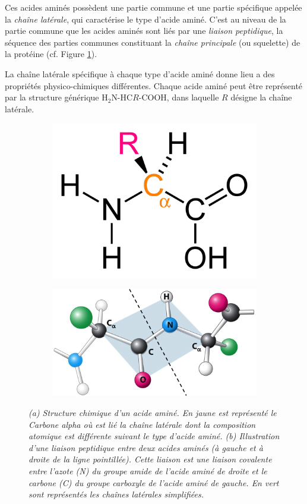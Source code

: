 Ces acides aminés possèdent une partie commune et une partie spécifique appelée la \textit{chaîne latérale}, qui caractérise le type d'acide aminé. C'est au niveau de la partie commune que les acides aminés sont liés par une \textit{liaison peptidique}, la séquence des parties communes constituant la \textit{chaîne principale} (ou squelette) de la protéine (cf. Figure \ref{Fig:amino_acid_structure}). 

La chaîne latérale spécifique à chaque type d'acide aminé donne lieu a des propriétés physico-chimiques différentes. Chaque acide aminé peut être représenté par la structure générique H$_{2}$N-HC$R$-COOH, dans laquelle $R$ désigne la chaîne latérale.

\begin{figure}
  \begin{subfigure}{.4\textwidth}
  \centering
  {\includegraphics[width=0.8\linewidth]{./figures/ch1/amino_acid_structure}}
    \caption{}
    \label{Fig:amino_acid_structure}
  \end{subfigure}
  \begin{subfigure}{.6\textwidth}
  \centering
  {\includegraphics[width=0.8\linewidth]{./figures/ch1/peptidic_bond.png}}
    \caption{}
    \label{Fig:peptide_bond}
  \hspace{0.2cm}
  \end{subfigure}
  \caption{\it (a) Structure chimique d'un acide aminé. En jaune est représenté le Carbone alpha où est lié la chaîne latérale dont la composition atomique est différente suivant le type d'acide aminé.
  (b) Illustration d'une liaison peptidique entre deux acides aminés (à gauche et à droite de la ligne pointillée). Cette liaison est une liaison covalente entre l'azote (N) du groupe amide de l'acide aminé de droite et le carbone (C) du groupe carboxyle de l'acide aminé de gauche. En vert sont représentés les chaînes latérales simplifiées.}
\end{figure}
